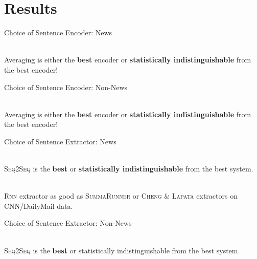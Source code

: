 \section{Results}


\begin{frame}{Choice of Sentence Encoder: News}
  \begin{center}
      
  \end{center}
  ~\\

  Averaging is either the \alert{\textbf{best}} encoder or 
  \textbf{statistically indistinguishable} from the best encoder!

\end{frame}

\begin{frame}{Choice of Sentence Encoder: Non-News}
  \begin{center}
        
  \end{center}
  ~\\

  Averaging is either the \alert{\textbf{best}} encoder or 
  \textbf{statistically indistinguishable} from the best encoder!
\end{frame}

\begin{frame}{Choice of Sentence Extractor: News}
    
 \begin{center}
   
 \end{center}
 
 ~\\

 \textsc{Seq2Seq} is the \alert{\textbf{best}} or \textbf{statistically 
 indistinguishable} from the best system.

 ~\\
 \textsc{Rnn} extractor as good as \textsc{SummaRunner} or 
 \textsc{Cheng \& Lapata} extractors on CNN/DailyMail data.

  

\end{frame}

\begin{frame}{Choice of Sentence Extractor: Non-News}
    
 \begin{center}
   
 \end{center}

 ~\\

 \textsc{Seq2Seq} is the \alert{\textbf{best}} or statistically indistinguishable from the best
 system.


\end{frame}



